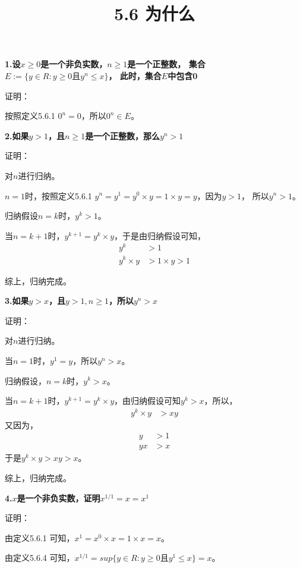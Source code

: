 \documentclass{article}
\theoremstyle{mystyle}
\begin{document}
\title{5.6 为什么}
\maketitle


\textbf{1.设$x \geq 0$是一个非负实数，$n \geq 1$是一个正整数，
  集合$E:=\{y \in R : y \geq 0 \text{且} y^n \leq x\}$，
  此时，集合$E$中包含0}

证明：

按照定义5.6.1 $0^n = 0$，所以$0^n \in E$。

\textbf{2.如果$y > 1$，且$n \geq 1$是一个正整数，那么$y^n > 1$}

证明：

对$n$进行归纳。

$n = 1$时，按照定义5.6.1 $y^n=y^1=y^0 \times y = 1 \times y = y$，因为$y > 1$，
所以$y^n > 1$。

归纳假设$n = k$时，$y^k > 1$。

当$n = k+1$时，$y^{k+1} = y^k \times y$，于是由归纳假设可知，
\begin{align*}
  y^k          & > 1              \\
  y^k \times y & > 1 \times y > 1
\end{align*}

综上，归纳完成。

\textbf{3.如果$y > x$，且$y > 1, n \geq 1$，所以$y^n > x$}

证明：

对$n$进行归纳。

当$n=1$时，$y^1 = y$，所以$y^n > x$。

归纳假设，$n=k$时，$y^k > x$。

当$n = k+1$时，$y^{k+1} = y^k \times y$，由归纳假设可知$y^k > x$，所以，
\begin{align*}
  y^k \times y & > xy
\end{align*}
又因为，
\begin{align*}
  y  & > 1 \\
  yx & > x
\end{align*}
于是$y^k \times y > xy > x$。

综上，归纳完成。

\textbf{4.$x$是一个非负实数，证明$x^{1/1}=x=x^1$}

证明：

由定义5.6.1 可知，$x^1 = x^0 \times x = 1 \times x = x$。

由定义5.6.4 可知，$x^{1/1} = sup\{y \in R: y \geq 0 \text{且} y^1 \leq x\} = x$。
\end{document}
